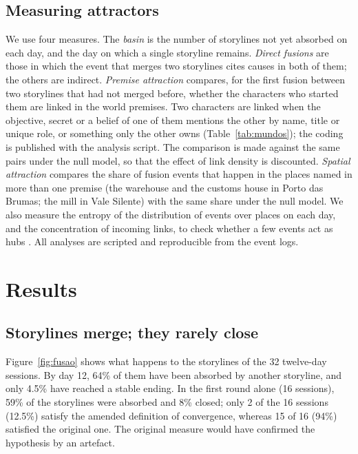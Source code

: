 \documentclass[12pt]{article}
\begin{document}
\subsection{Measuring attractors}

We use four measures. The \emph{basin} is the number of storylines not yet
absorbed on each day, and the day on which a single storyline remains.
\emph{Direct fusions} are those in which the event that merges two
storylines cites causes in both of them; the others are indirect.
\emph{Premise attraction} compares, for the first fusion between two
storylines that had not merged before, whether the characters who started
them are linked in the world premises. Two characters are linked when the
objective, secret or a belief of one of them mentions the other by name,
title or unique role, or something only the other owns
(Table~\ref{tab:mundos}); the coding is published with the analysis
script. The comparison is made against the same pairs under the null model,
so that the effect of link density is discounted. \emph{Spatial attraction}
compares the share of fusion events that happen in the places named in more
than one premise (the warehouse and the customs house in Porto das Brumas;
the mill in Vale Silente) with the same share under the null model. We also
measure the entropy of the distribution of events over places on each day,
and the concentration of incoming links, to check whether a few events act
as hubs \parencite{barabasi1999,newman2018}. All analyses are scripted and
reproducible from the event logs.

\section{Results}

\subsection{Storylines merge; they rarely close}

Figure~\ref{fig:fusao} shows what happens to the storylines of the 32
twelve-day sessions. By day 12, 64\% of them have been absorbed by another
storyline, and only 4.5\% have reached a stable ending. In the first round
alone (16 sessions), 59\% of the storylines were absorbed and 8\% closed;
only 2 of the 16 sessions (12.5\%) satisfy the amended definition of
convergence, whereas 15 of 16 (94\%) satisfied the original one. The
original measure would have confirmed the hypothesis by an artefact.
\end{document}
